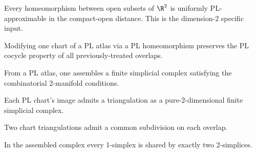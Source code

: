 \begin{lemma}
\label{lem:rado-dim2-pl-approx}
Every homeomorphism between open subsets of $\R^{2}$ is uniformly PL-approximable in the compact-open distance.  This is the dimension-2 specific input.
\leanok
\end{lemma}

\begin{lemma}
\label{lem:rado-pl-cocycle-preservation}
Modifying one chart of a PL atlas via a PL homeomorphism preserves the PL cocycle property of all previously-treated overlaps.
\leanok
\end{lemma}

\begin{lemma}
\label{lem:rado-assembled-simplicial-complex}
From a PL atlas, one assembles a finite simplicial complex satisfying the combinatorial 2-manifold conditions.
\leanok
\end{lemma}

\begin{lemma}
\label{lem:rado-triangulate-each-chart}
Each PL chart's image admits a triangulation as a pure-2-dimensional finite simplicial complex.
\leanok
\end{lemma}

\begin{lemma}
\label{lem:rado-common-subdivision}
Two chart triangulations admit a common subdivision on each overlap.
\leanok
\end{lemma}

\begin{lemma}
\label{lem:rado-edges-in-two-triangles}
In the assembled complex every 1-simplex is shared by exactly two 2-simplices.
\leanok
\end{lemma}

